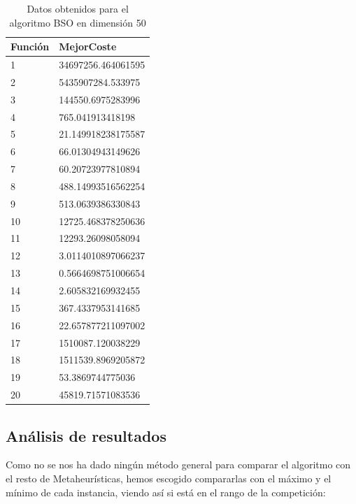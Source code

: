 \begin{table}[htbp]
	\begin{center}
		\begin{tabular}{|l|l|}
			\hline
			Función & MejorCoste \\
			\hline \hline
			1& 34697256.464061595 \\ \hline
			2& 5435907284.533975 \\ \hline
			3& 144550.6975283996 \\ \hline
			4& 765.041913418198 \\ \hline
			5& 21.149918238175587 \\ \hline
			6& 66.01304943149626 \\ \hline
			7& 60.20723977810894 \\ \hline
			8& 488.14993516562254 \\ \hline
			9& 513.0639386330843 \\ \hline
			10& 12725.468378250636 \\ \hline
			11& 12293.26098058094 \\ \hline
			12 & 3.0114010897066237 \\ \hline
			13 & 0.5664698751006654 \\ \hline
			14 & 2.605832169932455 \\ \hline
			15 & 367.4337953141685 \\ \hline
			16 & 22.657877211097002 \\ \hline
			17 & 1510087.120038229 \\ \hline
			18 & 1511539.8969205872 \\ \hline
			19 & 53.3869744775036 \\ \hline
			20 & 45819.71571083536 \\ \hline
			
		\end{tabular}
		\caption{Datos obtenidos para el algoritmo BSO en dimensión 50}
		\label{tabla:Dimension50}
	\end{center}
\end{table}


\newpage

\subsection{Análisis de resultados}

Como no se nos ha dado ningún método general para comparar el algoritmo con el resto de Metaheurísticas, hemos escogido compararlas con el máximo y el mínimo de cada instancia, viendo así si está en el rango de la competición:\\


